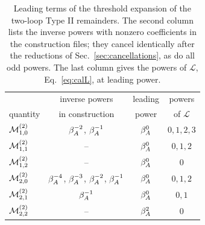 \begin{table}[t]
\centering


\begin{tabular}{lccc}
\toprule
& inverse powers & leading & powers \\
quantity & in construction & power & of $\mathcal L$ \\
\midrule
$\mathcal{M}^{(2)}_{1,0}$ & $\beta_A^{-2}$, $\beta_A^{-1}$ & $\beta_A^{0}$ & $0,1,2,3$ \\
$\mathcal{M}^{(2)}_{1,1}$ & -- & $\beta_A^{0}$ & $0,1,2$ \\
$\mathcal{M}^{(2)}_{1,2}$ & -- & $\beta_A^{0}$ & $0$ \\
$\mathcal{M}^{(2)}_{2,0}$ & $\beta_A^{-4}$, $\beta_A^{-3}$, $\beta_A^{-2}$, $\beta_A^{-1}$ & $\beta_A^{0}$ & $0,1,2$ \\
$\mathcal{M}^{(2)}_{2,1}$ & $\beta_A^{-1}$ & $\beta_A^{0}$ & $0,1$ \\
$\mathcal{M}^{(2)}_{2,2}$ & -- & $\beta_A^{2}$ & $0$ \\
\bottomrule
\end{tabular}
\caption{Leading terms of the threshold expansion of the two-loop Type II remainders. The second column lists the inverse powers with nonzero coefficients in the construction files; they cancel identically after the reductions of Sec.~\ref{sec:cancellations}, as do all odd powers. The last column gives the powers of $\mathcal L$, Eq.~\eqref{eq:calL}, at leading power.}
\label{tab:leading-threshold-inventory}
\end{table}
